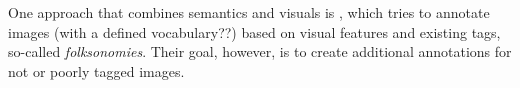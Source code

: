 
One approach that combines semantics and visuals is \cite{Lindstaedt2009}, which tries to annotate images (with a defined vocabulary??) based on visual features and existing tags, so-called \emph{folksonomies}. Their goal, however, is to create additional annotations for not or poorly tagged images.
